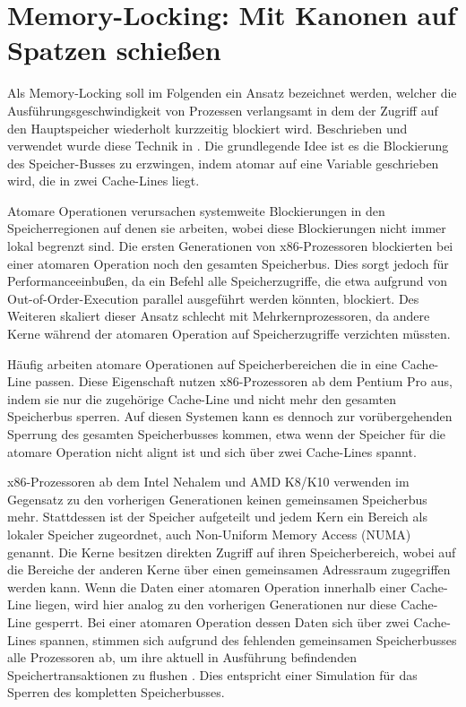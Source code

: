 \section{Memory-Locking: Mit Kanonen auf Spatzen schießen}
\label{MemoryLocking}

Als Memory-Locking soll im Folgenden ein Ansatz bezeichnet werden, welcher die Ausführungsgeschwindigkeit von Prozessen verlangsamt in dem der Zugriff auf den Hauptspeicher wiederholt kurzzeitig blockiert wird.
Beschrieben und verwendet wurde diese Technik in \cite{MemoryLockingWu, MemoryLockingRisenpart, MemoryLockingJavaAndroid}.
Die grundlegende Idee ist es die Blockierung des Speicher-Busses zu erzwingen, indem atomar auf eine Variable geschrieben wird, die in zwei Cache-Lines liegt.

Atomare Operationen verursachen systemweite Blockierungen in den Speicherregionen auf denen sie arbeiten, wobei diese Blockierungen nicht immer lokal begrenzt sind.
Die ersten Generationen von x86-Prozessoren blockierten bei einer atomaren Operation noch den gesamten Speicherbus.
Dies sorgt jedoch für Performanceeinbußen, da ein Befehl alle Speicherzugriffe, die etwa aufgrund von Out-of-Order-Execution parallel ausgeführt werden könnten, blockiert.
Des Weiteren skaliert dieser Ansatz schlecht mit Mehrkernprozessoren, da andere Kerne während der atomaren Operation auf Speicherzugriffe verzichten müssten.

Häufig arbeiten atomare Operationen auf Speicherbereichen die in eine Cache-Line passen. Diese Eigenschaft nutzen x86-Prozessoren ab dem Pentium Pro aus, indem sie nur die zugehörige Cache-Line und nicht mehr den gesamten Speicherbus sperren.
Auf diesen Systemen kann es dennoch zur vorübergehenden Sperrung des gesamten Speicherbusses kommen, etwa wenn der Speicher für die atomare Operation nicht alignt ist und sich über zwei Cache-Lines spannt.

x86-Prozessoren ab dem Intel Nehalem und AMD K8/K10 verwenden im Gegensatz zu den vorherigen Generationen keinen gemeinsamen Speicherbus mehr. Stattdessen ist der Speicher aufgeteilt und jedem Kern ein Bereich als lokaler Speicher zugeordnet, auch Non-Uniform Memory Access (NUMA) genannt. 
Die Kerne besitzen direkten Zugriff auf ihren Speicherbereich, wobei auf die Bereiche der anderen Kerne über einen gemeinsamen Adressraum zugegriffen werden kann.
Wenn die Daten einer atomaren Operation innerhalb einer Cache-Line liegen, wird hier analog zu den vorherigen Generationen nur diese Cache-Line gesperrt.
Bei einer atomaren Operation dessen Daten sich über zwei Cache-Lines spannen, stimmen sich aufgrund des fehlenden gemeinsamen Speicherbusses alle Prozessoren ab, um ihre aktuell in Ausführung befindenden Speichertransaktionen zu flushen \cite{MemoryLockingWu}.
Dies entspricht einer Simulation für das Sperren des kompletten Speicherbusses.

